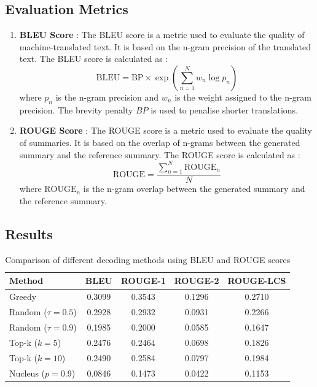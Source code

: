 \documentclass[12pt]{article}
\begin{document}
\subsection{Evaluation Metrics}

\begin{enumerate}
    \item \textbf{BLEU Score} : The BLEU score is a metric used to evaluate the quality of machine-translated text. It is based on the n-gram precision of the translated text. The BLEU score is calculated as :
    \begin{equation}
        \text{BLEU} = \text{BP} \times \exp\left(\sum_{n=1}^{N} w_n \log p_n\right)
    \end{equation}
    where $p_n$ is the n-gram precision and $w_n$ is the weight assigned to the n-gram precision. The brevity penalty $BP$ is used to penalise shorter translations.

    \item \textbf{ROUGE Score} : The ROUGE score is a metric used to evaluate the quality of summaries. It is based on the overlap of n-grams between the generated summary and the reference summary. The ROUGE score is calculated as :
    \begin{equation}
        \text{ROUGE} = \frac{\sum_{n=1}^{N} \text{ROUGE}_n}{N}
    \end{equation}
    where $\text{ROUGE}_n$ is the n-gram overlap between the generated summary and the reference summary.
\end{enumerate}


\subsection{Results}

\begin{table}[htbp]
    \centering
    \begin{tabular}{|lcccc|}
        \hline
        \textbf{Method} & BLEU & ROUGE-1 & ROUGE-2 & ROUGE-LCS \\
        \hline
        Greedy & 0.3099 & 0.3543 & 0.1296 & 0.2710 \\
        \hline
        Random ($\tau = 0.5$) & 0.2928 & 0.2932 & 0.0931 & 0.2266 \\
        Random ($\tau = 0.9$) & 0.1985 & 0.2000 & 0.0585 & 0.1647 \\
        \hline
        Top-k ($k = 5$) & 0.2476 & 0.2464 & 0.0698 & 0.1826 \\
        Top-k ($k = 10$) & 0.2490 & 0.2584 & 0.0797 & 0.1984 \\
        \hline
        Nucleus ($p = 0.9$) & 0.0846 & 0.1473 & 0.0422 & 0.1153 \\
        \hline
    \end{tabular}
    \caption{Comparison of different decoding methods using BLEU and ROUGE scores}
    \label{tab:decoding_comparison}
\end{table}
\end{document}
